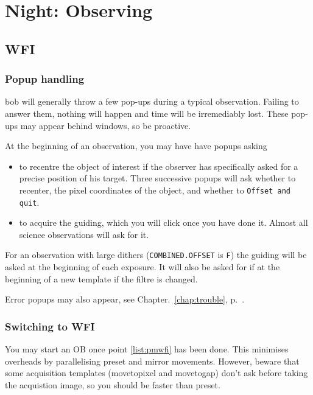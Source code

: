 \documentclass[11pt,fleqn]{book}
\def\chapref#1{Chapter.~\ref{chap:#1}, p.~\pageref{chap:#1}}
\begin{document}

\chapter{Night: Observing}
\label{chap:nightops}

\section{WFI}

\subsection{Popup handling}

\gls{bob} will generally throw a few pop-ups during a typical observation. Failing 
to answer them, nothing will happen and time will be irremediably lost.  These pop-ups may appear behind windows, so be proactive.

At the beginning of an observation, you may have have popups asking
\begin{itemize}
    \item to recentre the object of interest if the observer has specifically
    asked for a precise position of his target.  Three successive popups will
    ask whether to recenter, the pixel coordinates of the object, and whether
    to \texttt{Offset and quit}.
    \item to acquire the guiding, which you will click once you have done it. 
    Almost all science observations will ask  for it.
\end{itemize}

For an observation with large dithers (\texttt{COMBINED.OFFSET} is \texttt{F}) the
guiding will be asked at the beginning of each exposure.  It will also be asked for if at the beginning of a new template if the filtre is changed.

Error popups may also appear, see \chapref{trouble}.

\subsection{Switching to WFI}

You may start an OB once point \ref{list:pmwfi} has been done.  This minimises
overheads by parallelising \gls{preset} and mirror movements.  However, beware that some acquisition templates (movetopixel and movetogap) don't ask before taking the acquistion image, so you should be faster than preset.  
\end{document}

